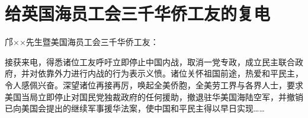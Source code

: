 \section[给英国海员工会三千华侨工友的复电（一九四六年六月二十六日）]{给英国海员工会三千华侨工友的复电}


邝××先生暨美国海员工会三千华侨工友：

接获来电，得悉诸位工友呼吁立即停止中国内战，取消一党专政，成立民主联合政府，并对依靠外力进行内战的行为表示义愤。诸位关怀祖国前途，热爱和平民主，令人感佩兴奋。深望诸位再接再厉，唤起全美侨胞，全美劳工界与各界人士，要求美国当局立即停止对国民党独裁政府的任何援助，撤退驻华美国海陆空军，并撤销已向美国会提出的继续军事援华法案，使中国和平民主得以早日实现……

